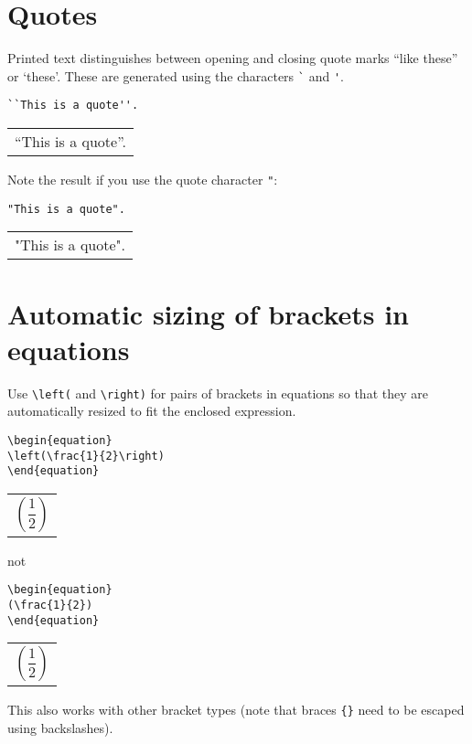 \documentclass[a4paper]{tufte-handout}
\begin{document}
\section{Quotes}
Printed text distinguishes between opening and closing quote marks ``like these'' or `these'. These are generated using the characters \lstinline{`} and \lstinline{'}.
\begin{lstlisting}
``This is a quote''.
\end{lstlisting}
\begin{tabular}{|p{10cm}}
``This is a quote''.
\end{tabular}

Note the result if you use the quote character \lstinline{"}:
\begin{lstlisting}
"This is a quote".
\end{lstlisting}
\begin{tabular}{|p{10cm}}
"This is a quote".
\end{tabular}

\section{Automatic sizing of brackets in equations}
Use \lstinline{\left(} and \lstinline{\right)} for pairs of brackets in equations so that they are automatically resized to fit the enclosed expression.
\begin{lstlisting}
\begin{equation}
\left(\frac{1}{2}\right)
\end{equation}
\end{lstlisting}
\begin{tabular}{|p{10cm}}
\begin{equation*}
\left(\frac{1}{2}\right)
\end{equation*}
\end{tabular}

not 
\begin{lstlisting}
\begin{equation}
(\frac{1}{2})
\end{equation}
\end{lstlisting}
\begin{tabular}{|p{10cm}}
\begin{equation*}
(\frac{1}{2})
\end{equation*}
\end{tabular}

This also works with other bracket types (note that braces \lstinline${}$ need to be escaped using backslashes).
\end{document}
